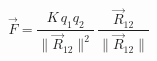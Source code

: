 \documentclass[preview]{standalone}
\begin{document}
\begin{align*}
\vec{F} = \dfrac{K \, q_1 q_2}{\lVert \vec{R}_{12} \rVert^2} \, \dfrac{\vec{R}_{12}}{\lVert \vec{R}_{12} \rVert}
\end{align*}
\end{document}
